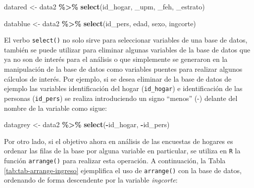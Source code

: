 \documentclass[
  spanish,
  12pt,
]{book}
\newenvironment{Shaded}{\begin{snugshade}}{\end{snugshade}}
\newcommand{\AttributeTok}[1]{\textcolor[rgb]{0.13,0.29,0.53}{#1}}
\newcommand{\FunctionTok}[1]{\textcolor[rgb]{0.13,0.29,0.53}{\textbf{#1}}}
\newcommand{\NormalTok}[1]{#1}
\newcommand{\OtherTok}[1]{\textcolor[rgb]{0.56,0.35,0.01}{#1}}
\newcommand{\SpecialCharTok}[1]{\textcolor[rgb]{0.81,0.36,0.00}{\textbf{#1}}}
\newcommand{\StringTok}[1]{\textcolor[rgb]{0.31,0.60,0.02}{#1}}
\begin{document}
\begin{Shaded}
\begin{Highlighting}[]
\NormalTok{datared }\OtherTok{\textless{}{-}}\NormalTok{ data2 }\SpecialCharTok{\%\textgreater{}\%} 
           \FunctionTok{select}\NormalTok{(}\StringTok{\textasciigrave{}}\AttributeTok{id\_hogar}\StringTok{\textasciigrave{}}\NormalTok{, }\StringTok{\textasciigrave{}}\AttributeTok{\_upm}\StringTok{\textasciigrave{}}\NormalTok{, }\StringTok{\textasciigrave{}}\AttributeTok{\_feh}\StringTok{\textasciigrave{}}\NormalTok{, }\StringTok{\textasciigrave{}}\AttributeTok{\_estrato}\StringTok{\textasciigrave{}}\NormalTok{)}

\NormalTok{datablue }\OtherTok{\textless{}{-}}\NormalTok{ data2 }\SpecialCharTok{\%\textgreater{}\%} 
            \FunctionTok{select}\NormalTok{(id\_pers, edad, sexo, ingcorte)}
\end{Highlighting}
\end{Shaded}

El verbo \texttt{select()} no solo sirve para seleccionar variables de una base de datos, también se puede utilizar para eliminar algunas variables de la base de datos que ya no son de interés para el análisis o que simplemente se generaron en la manipulación de la base de datos como variables puentes para realizar algunos cálculos de interés. Por ejemplo, si se desea eliminar de la base de datos de ejemplo las variables identificación del hogar (\texttt{id\_hogar}) e identificación de las personas (\texttt{id\_pers}) se realiza introduciendo un signo ``menos'' (-) delante del nombre de la variable como sigue:

\begin{Shaded}
\begin{Highlighting}[]
\NormalTok{datagrey }\OtherTok{\textless{}{-}}\NormalTok{ data2 }\SpecialCharTok{\%\textgreater{}\%} 
            \FunctionTok{select}\NormalTok{(}\SpecialCharTok{{-}}\NormalTok{id\_hogar, }\SpecialCharTok{{-}}\NormalTok{id\_pers)}
\end{Highlighting}
\end{Shaded}

Por otro lado, si el objetivo ahora en análisis de las encuestas de hogares es ordenar las filas de la base por alguna variable en particular, se utiliza en \texttt{R} la función \texttt{arrange()} para realizar esta operación. A continuación, la Tabla \ref{tab:tab-arrange-ingreso} ejemplifica el uso de \texttt{arrange()} con la base de datos, ordenando de forma descendente por la variable \emph{ingcorte}:
\end{document}
